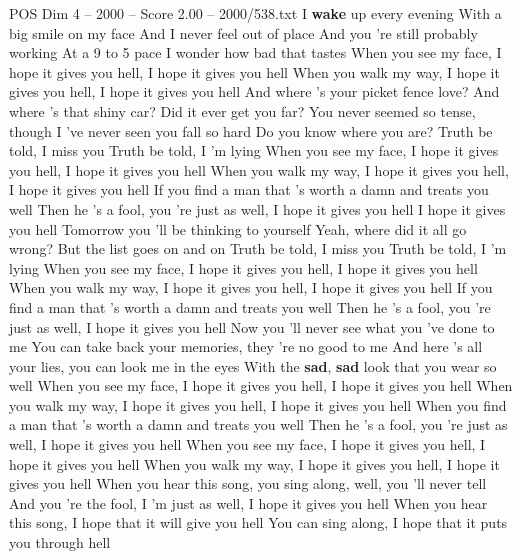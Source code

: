 \begin{textsample}{POS Dim 4 – 2000 – Score 2.00 – 2000/538.txt}  \label{ex:f4_pos_012}
I \textbf{wake} up every evening With a big smile on my face And I never feel out of place And you 're still probably working At a 9 to 5 pace I wonder how bad that tastes When you see my face, I hope it gives you hell, I hope it gives you hell When you walk my way, I hope it gives you hell, I hope it gives you hell And where 's your picket fence love?
And where 's that shiny car?
Did it ever get you far?
You never seemed so tense, though I 've never seen you fall so hard Do you know where you are?
Truth be told, I miss you Truth be told, I 'm lying When you see my face, I hope it gives you hell, I hope it gives you hell When you walk my way, I hope it gives you hell, I hope it gives you hell If you find a man that 's worth a damn and treats you well Then he 's a fool, you 're just as well, I hope it gives you hell I hope it gives you hell Tomorrow you 'll be thinking to yourself Yeah, where did it all go wrong?
But the list goes on and on Truth be told, I miss you Truth be told, I 'm lying When you see my face, I hope it gives you hell, I hope it gives you hell When you walk my way, I hope it gives you hell, I hope it gives you hell If you find a man that 's worth a damn and treats you well Then he 's a fool, you 're just as well, I hope it gives you hell Now you 'll never see what you 've done to me You can take back your memories, they 're no good to me And here 's all your lies, you can look me in the eyes With the \textbf{sad}, \textbf{sad} look that you wear so well When you see my face, I hope it gives you hell, I hope it gives you hell When you walk my way, I hope it gives you hell, I hope it gives you hell When you find a man that 's worth a damn and treats you well Then he 's a fool, you 're just as well, I hope it gives you hell When you see my face, I hope it gives you hell, I hope it gives you hell When you walk my way, I hope it gives you hell, I hope it gives you hell When you hear this song, you sing along, well, you 'll never tell And you 're the fool, I 'm just as well, I hope it gives you hell When you hear this song, I hope that it will give you hell You can sing along, I hope that it puts you through hell

\end{textsample}
